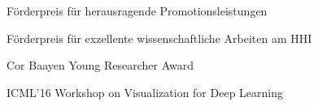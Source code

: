 {
    \ifdefined\shortcv
        {}
    \else
        {
            F\"orderpreis f\"ur herausragende Promotionsleistungen
        }
    \fi
}


{
    \ifdefined\shortcv
        {}
    \else
        {
            F\"orderpreis f\"ur exzellente wissenschaftliche Arbeiten am HHI
        }
    \fi
}


{
    \ifdefined\shortcv
        {}
    \else
        {
            Cor Baayen Young Researcher Award
        }
    \fi
}


{
    \ifdefined\shortcv
        {}
    \else
        {
            ICML'16 Workshop on Visualization for Deep Learning
        }
    \fi
}



